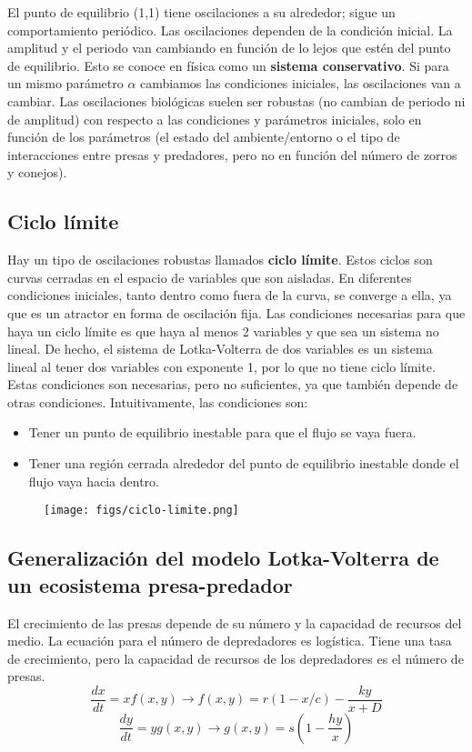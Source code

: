 El punto de equilibrio (1,1) tiene oscilaciones a su alrededor; sigue un comportamiento periódico. Las oscilaciones dependen de la condición inicial. La amplitud y el periodo van cambiando en función de lo lejos que estén del punto de equilibrio. Esto se conoce en física como un \textbf{sistema conservativo}.
Si para un mismo parámetro $\alpha$ cambiamos las condiciones iniciales, las oscilaciones van a cambiar. Las oscilaciones biológicas suelen ser robustas (no cambian de periodo ni de amplitud) con respecto a las condiciones y parámetros iniciales, solo en función de los parámetros (el estado del ambiente/entorno o el tipo de interacciones entre presas y predadores, pero no en función del número de zorros y conejos).

\subsection{Ciclo límite}
Hay un tipo de oscilaciones robustas llamados \textbf{ciclo límite}. Estos ciclos son curvas cerradas en el espacio de variables que son aisladas. En diferentes condiciones iniciales, tanto dentro como fuera de la curva, se converge a ella, ya que es un atractor en forma de oscilación fija. Las condiciones necesarias para que haya un ciclo límite es que haya al menos 2 variables y que sea un sistema no lineal. De hecho, el sistema de Lotka-Volterra de dos variables es un sistema lineal al tener dos variables con exponente 1, por lo que no tiene ciclo límite. Estas condiciones son necesarias, pero no suficientes, ya que también depende de otras condiciones. Intuitivamente, las condiciones son:
\begin{itemize}
\item Tener un punto de equilibrio inestable para que el flujo se vaya fuera.
\item Tener una región cerrada alrededor del punto de equilibrio inestable donde el flujo vaya hacia dentro.
\end{itemize}

\begin{figure}[h]
\centering
\texttt{[image: figs/ciclo-limite.png]}
\end{figure}

\subsection{Generalización del modelo Lotka-Volterra de un ecosistema presa-predador}
El crecimiento de las presas depende de su número y la capacidad de recursos del medio. La ecuación para el número de depredadores es logística. Tiene una tasa de crecimiento, pero la capacidad de recursos de los depredadores es el número de presas. 
$$\frac{dx}{dt} = xf(x,y) \rightarrow f(x,y) = r(1 - x/c) - \frac{ky}{x + D}$$
$$\frac{dy}{dt} = yg(x,y) \rightarrow g(x,y) = s(1 - \frac{hy}{x})$$

